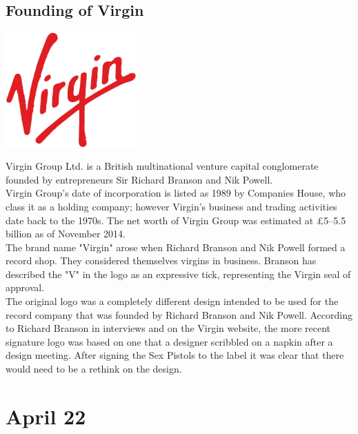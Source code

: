 \documentclass[11pt]{report}
\begin{document}
\subsection{Founding of Virgin}
\vspace{2mm}\begin{center}\includegraphics[width=5cm]{./img/virginLogo.jpg}\end{center}
Virgin Group Ltd. is a British multinational venture capital conglomerate founded by entrepreneurs Sir Richard Branson and Nik Powell.\\ \indent Virgin Group's date of incorporation is listed as 1989 by Companies House, who class it as a holding company; however Virgin's business and trading activities date back to the 1970s. The net worth of Virgin Group was estimated at £5–5.5 billion as of November 2014.\\ \indent The brand name "Virgin" arose when Richard Branson and Nik Powell formed a record shop. They considered themselves virgins in business. Branson has described the "V" in the logo as an expressive tick, representing the Virgin seal of approval.\\ \indent The original logo was a completely different design intended to be used for the record company that was founded by Richard Branson and Nik Powell. According to Richard Branson in interviews and on the Virgin website, the more recent signature logo was based on one that a designer scribbled on a napkin after a design meeting. After signing the Sex Pistols to the label it was clear that there would need to be a rethink on the design.
\section{April 22}
\end{document}
